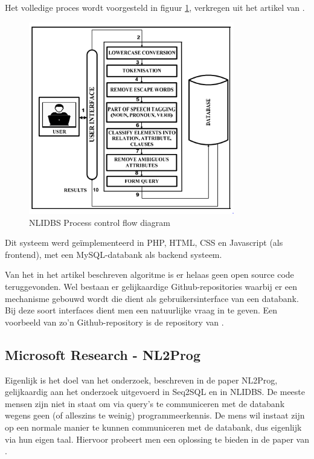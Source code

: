 Het volledige proces wordt voorgesteld in figuur \ref{fig:nlidbs}, verkregen uit het artikel van \textcite{nlidbs}.

\begin{figure}[ht]
	\centering
	\includegraphics[width=0.80\textwidth]{img/nlidbs}
	\caption[NLIDBS proces]{NLIDBS Process control flow diagram}
	\label{fig:nlidbs}
\end{figure}

Dit systeem werd geïmplementeerd in PHP, HTML, CSS en Javascript (als frontend), met een MySQL-databank als backend systeem.

Van het in het artikel beschreven algoritme is er helaas geen open source code teruggevonden. Wel bestaan er gelijkaardige Github-repositories waarbij er een mechanisme gebouwd wordt die dient als gebruikersinterface van een databank. Bij deze soort interfaces dient men een natuurlijke vraag in te geven. Een voorbeeld van zo'n Github-repository is de repository van \textcite{nlidb}.

\subsection{Microsoft Research - NL2Prog}

Eigenlijk is het doel van het onderzoek, beschreven in de paper NL2Prog, gelijkaardig aan het onderzoek uitgevoerd in Seq2SQL en in NLIDBS. De meeste mensen zijn niet in staat om via query's te communiceren met de databank wegens geen (of alleszins te weinig) programmeerkennis. De mens wil instaat zijn op een normale manier te kunnen communiceren met de databank, dus eigenlijk via hun eigen taal. Hiervoor probeert men een oplossing te bieden in de paper van \textcite{nl2prog}.		

